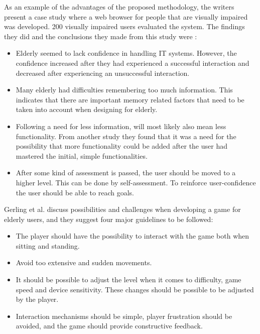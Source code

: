 As an example of the advantages of the proposed methodology, the writers present a case study where a web browser for people that are visually impaired was developed. 200 visually impaired users evaluated the system. The findings they did and the conclusions they made from this study were \cite{gregor}: 
\begin{itemize}
\item Elderly seemed to lack confidence in handling IT systems. However, the confidence increased after they had experienced a successful interaction and decreased after experiencing an unsuccessful interaction.
\item Many elderly had difficulties remembering too much information. This indicates that there are important memory related factors that need to be taken into account when designing for elderly. 
\item Following a need for less information, will most likely also mean less functionality. From another study they found that it was a need for the possibility that more functionality could be added after the user had mastered the initial, simple functionalities.
\item After some kind of assessment is passed, the user should be moved to a higher level. This can be done by self-assessment. To reinforce user-confidence the user should be able to reach goals. 
\end{itemize}

Gerling et al. \cite{gerling1} discuss possibilities and challenges when developing a game for elderly users, and they suggest four major guidelines to be followed:
\begin{itemize}
\item The player should have the possibility to interact with the game both when sitting and standing. 
\item Avoid too extensive and sudden movements.
\item It should be possible to adjust the level when it comes to difficulty, game speed and device sensitivity. These changes should be possible to be adjusted by the player. 
\item Interaction mechanisms should be simple, player frustration should be avoided, and the game should provide constructive feedback.
\end{itemize}

